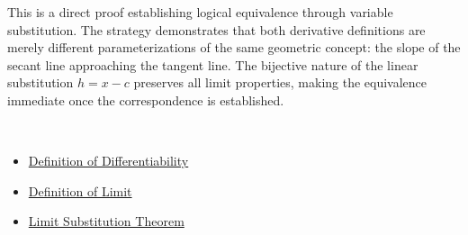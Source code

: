 \begin{remark*}
This is a direct proof establishing logical equivalence through variable substitution. The strategy demonstrates that both derivative definitions are merely different parameterizations of the same geometric concept: the slope of the secant line approaching the tangent line. The bijective nature of the linear substitution $h = x - c$ preserves all limit properties, making the equivalence immediate once the correspondence is established.
\end{remark*}

\begin{remark*}[Dependencies]~\\
\begin{itemize}
  \item \hyperref[def:differentiability]{Definition of Differentiability}
  \item \hyperref[def:limit]{Definition of Limit}
  \item \hyperref[thm:limit-substitution]{Limit Substitution Theorem}
\end{itemize}
\end{remark*}